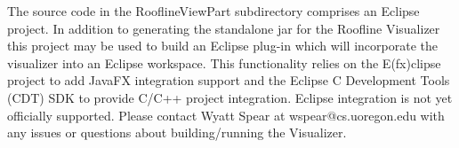 The source code in the RooflineViewPart subdirectory comprises an Eclipse project. In addition to generating the standalone jar for the Roofline Visualizer this project may be used to build an Eclipse plug-in which will incorporate the visualizer into an Eclipse workspace. This functionality relies on the E(fx)clipse project to add JavaFX integration support and the Eclipse C Development Tools (CDT) SDK to provide C/C++ project integration. Eclipse integration is not yet officially supported. Please contact Wyatt Spear at wspear@cs.uoregon.edu with any issues or questions about building/running the Visualizer.

